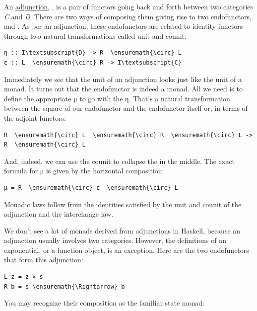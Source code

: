 An \hyperref[adjunctions]{adjunction},
, is a pair of functors going back and forth between two
categories \emph{C} and \emph{D}. There are two ways of composing them
giving rise to two endofunctors,  and .
As per an adjunction, these endofunctors are related to identity
functors through two natural transformations called unit and counit:

\begin{Verbatim}[commandchars=\\\{\}]
η :: I\textsubscript{D} -> R  \ensuremath{\circ} L
ε :: L  \ensuremath{\circ} R -> I\textsubscript{C}
\end{Verbatim}
Immediately we see that the unit of an adjunction looks just like the
unit of a monad. It turns out that the endofunctor  is
indeed a monad. All we need is to define the appropriate μ to go with
the η. That's a natural transformation between the square of our
endofunctor and the endofunctor itself or, in terms of the adjoint
functors:

\begin{Verbatim}[commandchars=\\\{\}]
R  \ensuremath{\circ} L  \ensuremath{\circ} R  \ensuremath{\circ} L -> R  \ensuremath{\circ} L
\end{Verbatim}
And, indeed, we can use the counit to collapse the  in
the middle. The exact formula for μ is given by the horizontal
composition:

\begin{Verbatim}[commandchars=\\\{\}]
μ = R  \ensuremath{\circ} ε  \ensuremath{\circ} L
\end{Verbatim}
Monadic laws follow from the identities satisfied by the unit and counit
of the adjunction and the interchange law.

We don't see a lot of monads derived from adjunctions in Haskell,
because an adjunction usually involves two categories. However, the
definitions of an exponential, or a function object, is an exception.
Here are the two endofunctors that form this adjunction:

\begin{Verbatim}[commandchars=\\\{\}]
L z = z × s
R b = s \ensuremath{\Rightarrow} b
\end{Verbatim}
You may recognize their composition as the familiar state monad:


